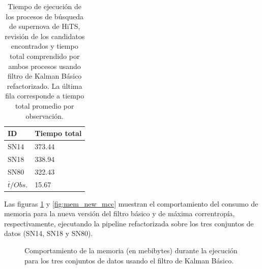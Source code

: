 \begin{table}[h!]
\centering
\caption{Tiempo de ejecuci\'on de los procesos de b\'usqueda de supernova de HiTS, revisi\'on de los candidatos encontrados y tiempo total comprendido por ambos procesos usando filtro de Kalman B\'asico refactorizado. La \'ultima fila corresponde a tiempo total promedio por observaci\'on.}
\begin{tabular}{|l|l|}
\hline
\textbf{ID} & \textbf{Tiempo total} \\ \hline
\hline
SN14  & 373.44 \\\hline
SN18  & 338.94\\\hline
SN80  & 322.43 \\\hline\hline
 $\bar{t}/Obs. $& 15.67 \\\hline 
\end{tabular}
\label{tab:t8}

\end{table}

Las figuras \ref{fig:mem_new_kbf} y \ref{fig:mem_new_mcc} muestran el comportamiento del consumo de memoria para la nueva versi\'on del filtro b\'asico y de m\'axima correntrop\'ia, respectivamente, ejecutando la pipeline refactorizada sobre los tres conjuntos de datos (SN14, SN18 y SN80). 

\begin{figure}[h!]
\centering
{}\hfill
{}\vfill
{}
\caption{Comportamiento de la memoria (en mebibytes) durante la ejecuci\'on para los tres conjuntos de datos usando el filtro de Kalman B\'asico.}
\label{fig:mem_new_kbf}
\end{figure}

